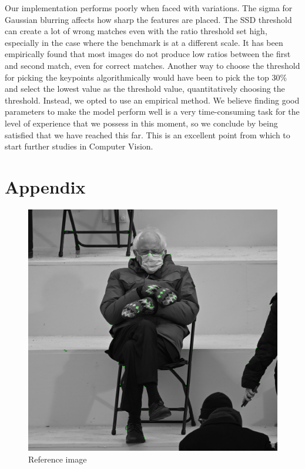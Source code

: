 \documentclass[12pt,a4paper]{report}
\begin{document}
Our implementation performs poorly when faced with variations. The sigma for Gaussian blurring affects how sharp the features are placed. The SSD threshold can create a lot of wrong matches even with the ratio threshold set high, especially in the case where the benchmark is at a different scale. It has been empirically found that most images do not produce low ratios between the first and second match, even for correct matches. Another way to choose the threshold for picking the keypoints algorithmically would have been to pick the top 30\% and select the lowest value as the threshold value, quantitatively choosing the threshold. Instead, we opted to use an empirical method. We believe finding good parameters to make the model perform well is a very time-consuming task for the level of experience that we possess in this moment, so we conclude by being satisfied that we have reached this far. This is an excellent point from which to start further studies in Computer Vision.

\clearpage
\section*{Appendix}

\begin{figure}[hb]
	\centering
	\includegraphics[width=\textwidth]{orig_keypoints}
	\caption{Reference image}
\end{figure}
\end{document}

